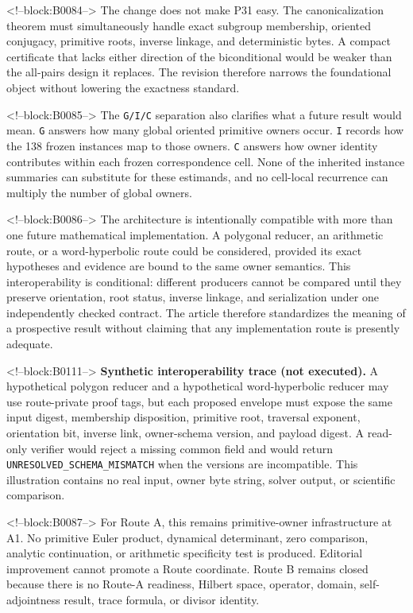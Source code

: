 \documentclass[11pt]{article}
\begin{document}
<!--block:B0084-->
The change does not make P31 easy. The canonicalization theorem must
simultaneously handle exact subgroup membership, oriented conjugacy,
primitive roots, inverse linkage, and deterministic bytes. A compact
certificate that lacks either direction of the biconditional would be
weaker than the all-pairs design it replaces. The revision therefore
narrows the foundational object without lowering the exactness standard.

<!--block:B0085-->
The \texttt{G/I/C} separation also clarifies what a future result would
mean. \texttt{G} answers how many global oriented primitive owners
occur. \texttt{I} records how the 138 frozen instances map to those
owners. \texttt{C} answers how owner identity contributes within each
frozen correspondence cell. None of the inherited instance summaries can
substitute for these estimands, and no cell-local recurrence can
multiply the number of global owners.

<!--block:B0086-->
The architecture is intentionally compatible with more than one future
mathematical implementation. A polygonal reducer, an arithmetic route,
or a word-hyperbolic route could be considered, provided its exact
hypotheses and evidence are bound to the same owner semantics. This
interoperability is conditional: different producers cannot be compared
until they preserve orientation, root status, inverse linkage, and
serialization under one independently checked contract. The article
therefore standardizes the meaning of a prospective result without
claiming that any implementation route is presently adequate.

<!--block:B0111-->
\noindent\textbf{Synthetic interoperability trace (not executed).}
A hypothetical polygon reducer and a hypothetical word-hyperbolic reducer may
use route-private proof tags, but each proposed envelope must expose the same
input digest, membership disposition, primitive root, traversal exponent,
orientation bit, inverse link, owner-schema version, and payload digest. A
read-only verifier would reject a missing common field and would return
\texttt{UNRESOLVED\_SCHEMA\_MISMATCH} when the versions are incompatible.
This illustration contains no real input, owner byte string, solver output, or
scientific comparison.

<!--block:B0087-->
For Route A, this remains primitive-owner infrastructure at A1. No
primitive Euler product, dynamical determinant, zero comparison,
analytic continuation, or arithmetic specificity test is produced.
Editorial improvement cannot promote a Route coordinate. Route B remains
closed because there is no Route-A readiness, Hilbert space, operator,
domain, self-adjointness result, trace formula, or divisor identity.
\end{document}
